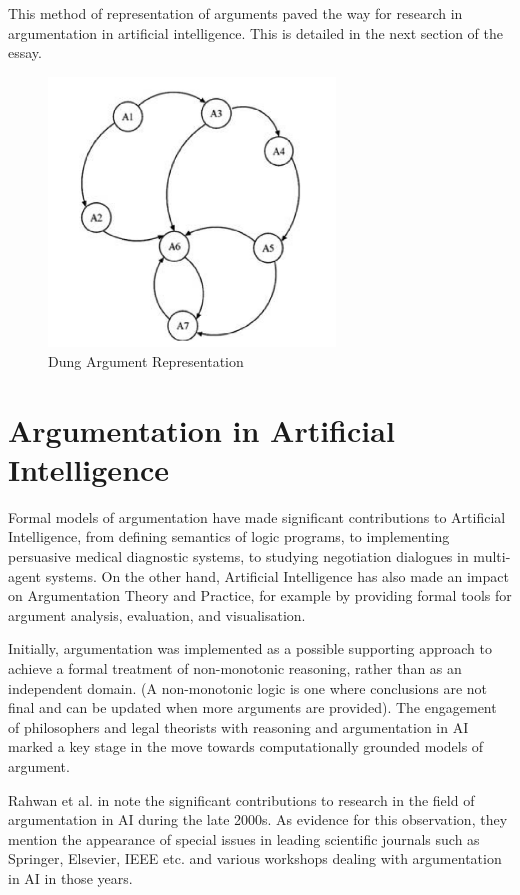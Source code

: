\documentclass[sigconf]{acmart}
\begin{document}
This method of representation of arguments paved the way for research in argumentation in artificial intelligence. This is detailed in the next section of the essay.

\begin{figure}
  \centering
  \includegraphics[width=3in]{images/pmdungaaf.png}
  \caption{Dung Argument Representation \cite{rahwan2009argumentation}}
  \label{DungArgRep}
\end{figure}

\section{Argumentation in Artificial Intelligence}
Formal models of argumentation have made significant contributions to Artificial Intelligence, from defining semantics of logic programs, to implementing persuasive medical diagnostic systems, to studying negotiation dialogues in multi-agent systems. On the other hand, Artificial Intelligence has also made an impact on Argumentation Theory and Practice, for example by providing formal tools for argument analysis, evaluation, and visualisation.

Initially, argumentation was implemented as a possible supporting approach to achieve a formal treatment of non-monotonic reasoning, rather than as an independent domain. (A non-monotonic logic is one where conclusions are not final and can be updated when more arguments are provided). The engagement of philosophers and legal theorists with reasoning and argumentation in AI marked a key stage in the move towards computationally grounded models of argument.\cite{BENCHCAPON2007619}

Rahwan et al. in \cite{rahwan2009argumentation} note the significant contributions to research in the field of argumentation in AI during the late 2000s. As evidence for this observation, they mention the appearance of special issues in leading scientific journals such as Springer, Elsevier, IEEE etc. and various workshops dealing with argumentation in AI in those years.
\end{document}
